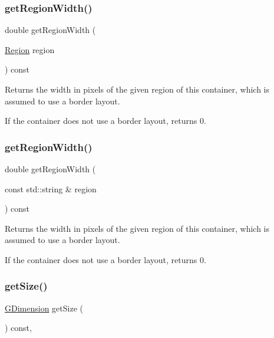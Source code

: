 \subsubsection{\texorpdfstring{get\+Region\+Width()}{getRegionWidth()}\hspace{0.1cm}{\footnotesize\ttfamily [1/2]}}
{\footnotesize\ttfamily double get\+Region\+Width (\begin{DoxyParamCaption}\item[{\mbox{\hyperlink{classGContainer_a81a01a86de31071a92e6cce0bab9bc4b}{Region}}}]{region }\end{DoxyParamCaption}) const\hspace{0.3cm}{\ttfamily [virtual]}}



Returns the width in pixels of the given region of this container, which is assumed to use a border layout. 

If the container does not use a border layout, returns 0. \mbox{\label{classGContainer_ab169dab454fc90f1c845b91b4e1a8a14}} 
\subsubsection{\texorpdfstring{get\+Region\+Width()}{getRegionWidth()}\hspace{0.1cm}{\footnotesize\ttfamily [2/2]}}
{\footnotesize\ttfamily double get\+Region\+Width (\begin{DoxyParamCaption}\item[{const std\+::string \&}]{region }\end{DoxyParamCaption}) const\hspace{0.3cm}{\ttfamily [virtual]}}



Returns the width in pixels of the given region of this container, which is assumed to use a border layout. 

If the container does not use a border layout, returns 0. \mbox{\label{classGInteractor_a7b4eec96a2bdc6420695d5796a78eea9}} 
\subsubsection{\texorpdfstring{get\+Size()}{getSize()}}
{\footnotesize\ttfamily \mbox{\hyperlink{classGDimension}{G\+Dimension}} get\+Size (\begin{DoxyParamCaption}{ }\end{DoxyParamCaption}) const\hspace{0.3cm}{\ttfamily [virtual]}, {\ttfamily [inherited]}}



